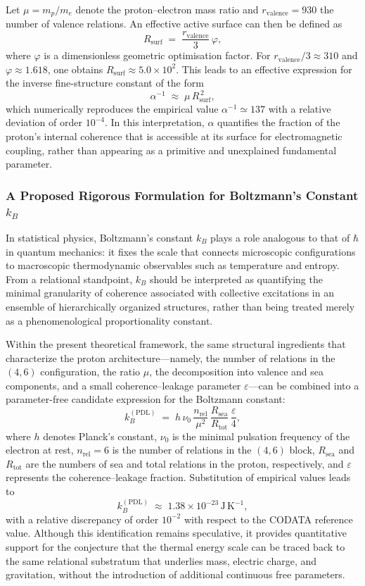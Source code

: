 \documentclass[11pt,a4paper]{article}
\begin{document}
Let \(\mu = m_p/m_e\) denote the proton–electron mass ratio and \(r_{\mathrm{valence}} = 930\) the number of valence relations. An effective active surface can then be defined as
\[
  R_{\mathrm{surf}} \;=\; \frac{r_{\mathrm{valence}}}{3}\,\varphi,
\]
where \(\varphi\) is a dimensionless geometric optimisation factor. For \(r_{\mathrm{valence}}/3 \approx 310\) and \(\varphi \approx 1.618\), one obtains \(R_{\mathrm{surf}} \approx 5.0 \times 10^2\). This leads to an effective expression for the inverse fine-structure constant of the form
\[
  \alpha^{-1} \;\approx\; \mu\,R_{\mathrm{surf}}^{\,2},
\]
which numerically reproduces the empirical value \(\alpha^{-1} \simeq 137\) with a relative deviation of order \(10^{-4}\). In this interpretation, \(\alpha\) quantifies the fraction of the proton’s internal coherence that is accessible at its surface for electromagnetic coupling, rather than appearing as a primitive and unexplained fundamental parameter.

\subsubsection{A Proposed Rigorous Formulation for Boltzmann's Constant \texorpdfstring{$k_B$}{kB}}

In statistical physics, Boltzmann’s constant \(k_B\) plays a role analogous to that of \(\hbar\) in quantum mechanics: it fixes the scale that connects microscopic configurations to macroscopic thermodynamic observables such as temperature and entropy. From a relational standpoint, \(k_B\) should be interpreted as quantifying the minimal granularity of coherence associated with collective excitations in an ensemble of hierarchically organized structures, rather than being treated merely as a phenomenological proportionality constant.

Within the present theoretical framework, the same structural ingredients that characterize the proton architecture—namely, the number of relations in the \((4,6)\) configuration, the ratio \(\mu\), the decomposition into valence and sea components, and a small coherence–leakage parameter \(\varepsilon\)—can be combined into a parameter-free candidate expression for the Boltzmann constant:
\[
  k_B^{\mathrm{(PDL)}} \;=\; h\,\nu_0\,\frac{n_{\mathrm{rel}}}{\mu^2}\,\frac{R_{\mathrm{sea}}}{R_{\mathrm{tot}}}\,\frac{\varepsilon}{4},
\]
where \(h\) denotes Planck’s constant, \(\nu_0\) is the minimal pulsation frequency of the electron at rest, \(n_{\mathrm{rel}} = 6\) is the number of relations in the \((4,6)\) block, \(R_{\mathrm{sea}}\) and \(R_{\mathrm{tot}}\) are the numbers of sea and total relations in the proton, respectively, and \(\varepsilon\) represents the coherence–leakage fraction. Substitution of empirical values leads to
\[
  k_B^{\mathrm{(PDL)}} \;\approx\; 1.38 \times 10^{-23}\,\text{J}\,\text{K}^{-1},
\]
with a relative discrepancy of order \(10^{-2}\) with respect to the CODATA reference value. Although this identification remains speculative, it provides quantitative support for the conjecture that the thermal energy scale can be traced back to the same relational substratum that underlies mass, electric charge, and gravitation, without the introduction of additional continuous free parameters.
\end{document}
